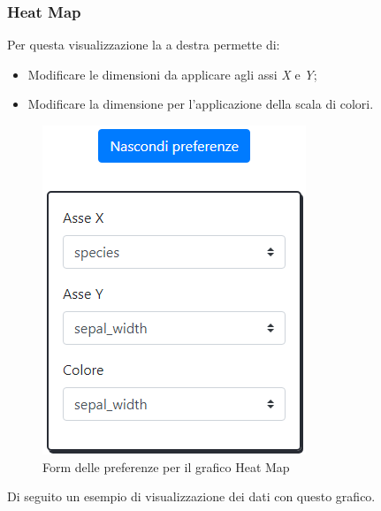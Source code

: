 \newpage

\subsubsection{Heat Map}

Per questa visualizzazione la  a destra permette di:
\begin{itemize}
	\item Modificare le dimensioni da applicare agli assi \textit{X} e \textit{Y};
	\item Modificare la dimensione per l'applicazione della scala di colori.
\end{itemize} 

\begin{figure}[H]
		\includegraphics[scale=0.6]{Images/hmp.png}
		\centering
		\caption{Form delle preferenze per il grafico Heat Map}
\end{figure}
Di seguito un esempio di visualizzazione dei dati con questo grafico.

